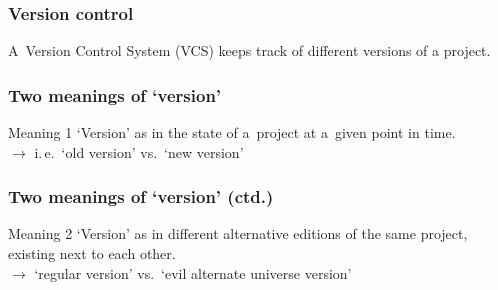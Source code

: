 \documentclass[12pt]{beamer}
\begin{document}
\begin{frame}
  \frametitle{Version control}

  A~\alert{Version Control System} (VCS) keeps track of different versions of
  a project.
\end{frame}

\begin{frame}
  \frametitle{Two meanings of `version'}

  \begin{block}{Meaning 1}
    `Version' as in the state of a~project at a~given point in time.\\
    $\rightarrow$ i.\,e.\ `old version' vs.\ `new version'
  \end{block}
\end{frame}

\begin{frame}
  \frametitle{Two meanings of `version' (ctd.)}

  \begin{block}{Meaning 2}
    `Version' as in different alternative editions of the same project, existing
    next to each other.\\
    $\to$ `regular version' vs.\ `evil alternate universe version'
  \end{block}
\end{frame}
\end{document}
